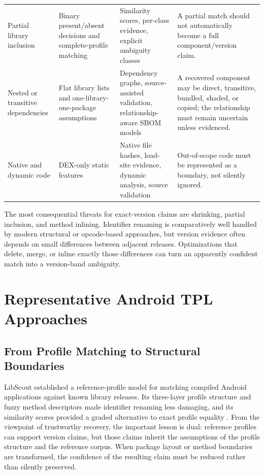 \begin{longtable}{p{}p{}p{}p{}}
Partial library inclusion &
Binary present/absent decisions and complete-profile matching &
Similarity scores, per-class evidence, explicit ambiguity classes &
A partial match should not automatically become a full component/version
claim.\\

Nested or transitive dependencies &
Flat library lists and one-library-one-package assumptions &
Dependency graphs, source-assisted validation, relationship-aware SBOM
models &
A recovered component may be direct, transitive, bundled, shaded, or copied;
the relationship must remain uncertain unless evidenced.\\

Native and dynamic code &
DEX-only static features &
Native file hashes, load-site evidence, dynamic analysis, source validation &
Out-of-scope code must be represented as a boundary, not silently ignored.\\
\end{longtable}
\endgroup

The most consequential threats for exact-version claims are shrinking,
partial inclusion, and method inlining. Identifier renaming is comparatively
well handled by modern structural or opcode-based approaches, but version
evidence often depends on small differences between adjacent releases.
Optimizations that delete, merge, or inline exactly those differences can turn
an apparently confident match into a version-band ambiguity.

\section{Representative Android TPL Approaches}

\subsection{From Profile Matching to Structural Boundaries}

LibScout established a reference-profile model for matching compiled Android
applications against known library releases. Its three-layer profile structure
and fuzzy method descriptors made identifier renaming less damaging, and its
similarity scores provided a graded alternative to exact profile equality
\cite{backes2016libscout}. From the viewpoint of trustworthy \SBOM recovery,
the important lesson is dual: reference profiles can support version claims,
but those claims inherit the assumptions of the profile structure and the
reference corpus. When package layout or method boundaries are transformed,
the confidence of the resulting claim must be reduced rather than silently
preserved.

